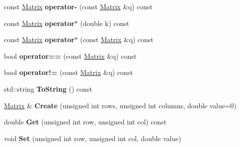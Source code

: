 \begin{DoxyCompactItemize}
\item 
\hypertarget{classdfv_1_1Matrix_a0479733c20cc950f900de2a18ec824f2}{const \hyperlink{classdfv_1_1Matrix}{\-Matrix} {\bfseries operator-\/} (const \hyperlink{classdfv_1_1Matrix}{\-Matrix} \&q) const }\label{classdfv_1_1Matrix_a0479733c20cc950f900de2a18ec824f2}

\item 
\hypertarget{classdfv_1_1Matrix_aef7b9b1396bb921dcd2f3c25cad6db51}{const \hyperlink{classdfv_1_1Matrix}{\-Matrix} {\bfseries operator$\ast$} (double k) const }\label{classdfv_1_1Matrix_aef7b9b1396bb921dcd2f3c25cad6db51}

\item 
\hypertarget{classdfv_1_1Matrix_a1abee67dc5d00111b6842d7c761d14ac}{const \hyperlink{classdfv_1_1Matrix}{\-Matrix} {\bfseries operator$\ast$} (const \hyperlink{classdfv_1_1Matrix}{\-Matrix} \&q) const }\label{classdfv_1_1Matrix_a1abee67dc5d00111b6842d7c761d14ac}

\item 
\hypertarget{classdfv_1_1Matrix_a31969b5300c94e92b1dacae1c2e58d5c}{bool {\bfseries operator==} (const \hyperlink{classdfv_1_1Matrix}{\-Matrix} \&q) const }\label{classdfv_1_1Matrix_a31969b5300c94e92b1dacae1c2e58d5c}

\item 
\hypertarget{classdfv_1_1Matrix_a2757a2bbd6a25c1380ffc192f8064b11}{bool {\bfseries operator!=} (const \hyperlink{classdfv_1_1Matrix}{\-Matrix} \&q) const }\label{classdfv_1_1Matrix_a2757a2bbd6a25c1380ffc192f8064b11}

\item 
\hypertarget{classdfv_1_1Matrix_a156b276550ab4558d8e0932579a7ab2a}{std\-::string {\bfseries \-To\-String} () const }\label{classdfv_1_1Matrix_a156b276550ab4558d8e0932579a7ab2a}

\item 
\hypertarget{classdfv_1_1Matrix_adc7cf08bcd951901d4be15601611641f}{\hyperlink{classdfv_1_1Matrix}{\-Matrix} \& {\bfseries \-Create} (unsigned int rows, unsigned int columns, double value=0)}\label{classdfv_1_1Matrix_adc7cf08bcd951901d4be15601611641f}

\item 
\hypertarget{classdfv_1_1Matrix_aaaec0f3bfe4f1538e115b3b5bf8db5bd}{double {\bfseries \-Get} (unsigned int row, unsigned int col) const }\label{classdfv_1_1Matrix_aaaec0f3bfe4f1538e115b3b5bf8db5bd}

\item 
\hypertarget{classdfv_1_1Matrix_a3172608cf178222b05aa6e9d49884947}{void {\bfseries \-Set} (unsigned int row, unsigned int col, double value)}\label{classdfv_1_1Matrix_a3172608cf178222b05aa6e9d49884947}


\end{DoxyCompactItemize}
